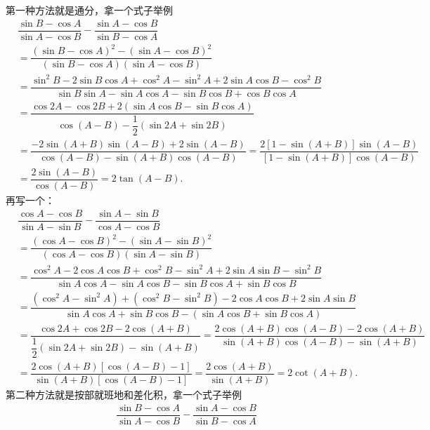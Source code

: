 \begin{solution}
第一种方法就是通分，拿一个式子举例
\begin{align*}
&\dfrac{\sin B - \cos A}{\sin A - \cos B} - \dfrac{\sin A - \cos B}{\sin B - \cos A}\\[1.2ex]
&=\dfrac{(\sin B - \cos A)^2 - (\sin A - \cos B)^2}{(\sin B - \cos A)\left(\sin A - \cos B\right)}\\[1.2ex]
&=\dfrac{\sin^2 B - 2\sin B \cos A + \cos^2 A - \sin^2 A + 2\sin A \cos B - \cos^2 B}{\sin B \sin A - \sin A \cos A - \sin B \cos B + \cos B \cos A}\\[1.2ex]
&=\dfrac{\cos 2A - \cos 2B + 2\left(\sin A \cos B - \sin B \cos A\right)}{\cos\left(A - B\right) - \dfrac{1}{2}\left(\sin 2A + \sin 2B\right)}\\[1.2ex]
&=\dfrac{-2\sin\left(A + B\right)\sin\left(A - B\right) + 2\sin\left(A - B\right)}{\cos\left(A - B\right) - \sin\left(A + B\right)\cos\left(A - B\right)}
=\dfrac{2\left[1 - \sin\left(A + B\right)\right]\sin\left(A - B\right)}{\left[1 - \sin\left(A + B\right)\right]\cos\left(A - B\right)}
\\[1.2ex]&=\dfrac{2\sin\left(A - B\right)}{\cos\left(A - B\right)} = 2\tan\left(A - B\right).
\end{align*}
再写一个：
\begin{align*}
&\dfrac{\cos A - \cos B}{\sin A - \sin B} - \dfrac{\sin A - \sin B}{\cos A - \cos B}\\[1.2ex]
&=\dfrac{(\cos A - \cos B)^2 - (\sin A - \sin B)^2}{(\cos A - \cos B)(\sin A - \sin B)}\\[1.2ex]
&=\dfrac{\cos^2 A - 2\cos A\cos B + \cos^2 B - \sin^2 A + 2\sin A\sin B - \sin^2 B}{\sin A\cos A - \sin A\cos B - \sin B\cos A + \sin B\cos B}\\[1.2ex]
&=\dfrac{(\cos^2 A - \sin^2 A) + (\cos^2 B - \sin^2 B) - 2\cos A\cos B + 2\sin A\sin B}{\sin A\cos A + \sin B\cos B - (\sin A\cos B + \sin B\cos A)}\\[1.2ex]
&=\dfrac{\cos 2A + \cos 2B - 2\cos(A + B)}{\dfrac{1}{2}(\sin 2A + \sin 2B) - \sin(A + B)}
=\dfrac{2\cos(A + B)\cos(A - B) - 2\cos(A + B)}{\sin(A + B)\cos(A - B) - \sin(A + B)}\\[1.2ex]
&=\dfrac{2\cos(A + B)[\cos(A - B) - 1]}{\sin(A + B)[\cos(A - B) - 1]}
=\dfrac{2\cos(A + B)}{\sin(A + B)} = 2\cot(A + B).
\end{align*}
第二种方法就是按部就班地和差化积，拿一个式子举例
\begin{align*}
&\dfrac{\sin B - \cos A}{\sin A - \cos B} - \dfrac{\sin A - \cos B}{\sin B - \cos A}\\[1.2ex]

\end{align*}
\end{solution}
